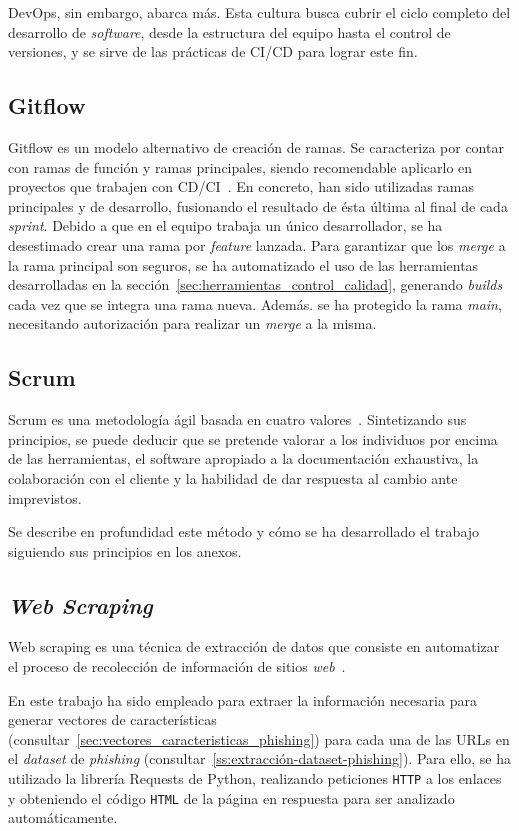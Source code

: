 DevOps, sin embargo, abarca más. Esta cultura busca cubrir el ciclo completo del desarrollo de \textit{software}, desde la estructura del equipo hasta el control de versiones, y se sirve de las prácticas de CI/CD para lograr este fin.

\subsection{Gitflow}

Gitflow es un modelo alternativo de creación de ramas. Se caracteriza por contar con ramas de función y ramas principales, siendo recomendable aplicarlo en proyectos que trabajen con CD/CI~\cite{gitFlow}. En concreto, han sido utilizadas ramas principales y de desarrollo, fusionando el resultado de ésta última al final de cada \textit{sprint}. Debido a que en el equipo trabaja un único desarrollador, se ha desestimado crear una rama por \textit{feature} lanzada. Para garantizar que los \textit{merge} a la rama principal son seguros, se ha automatizado el uso de las herramientas desarrolladas en la sección~\ref{sec:herramientas_control_calidad}, generando \textit{builds} cada vez que se integra una rama nueva. Además. se ha protegido la rama \textit{main}, necesitando autorización para realizar un \textit{merge} a la misma.

\subsection{Scrum}

Scrum es una metodología ágil basada en cuatro valores~\cite{scrumMaster2022}. Sintetizando sus principios, se puede deducir que se pretende valorar a los individuos por encima de las herramientas, el software apropiado a la documentación exhaustiva, la colaboración con el cliente y la habilidad de dar respuesta al cambio ante imprevistos.

Se describe en profundidad este método y cómo se ha desarrollado el trabajo siguiendo sus principios en los anexos.

\subsection{\textit{Web Scraping}}

Web scraping es una técnica de extracción de datos que consiste en automatizar el proceso de recolección de información de sitios \textit{web}~\cite{webScraping}.

En este trabajo ha sido empleado para extraer la información necesaria para generar vectores de características (consultar~\ref{sec:vectores_caracteristicas_phishing}) para cada una de las URLs en el \textit{dataset} de \textit{phishing} (consultar~\ref{ss:extracción-dataset-phishing}). Para ello, se ha utilizado la librería Requests de Python, realizando peticiones \texttt{HTTP} a los enlaces y obteniendo el código \texttt{HTML} de la página en respuesta para ser analizado automáticamente.

